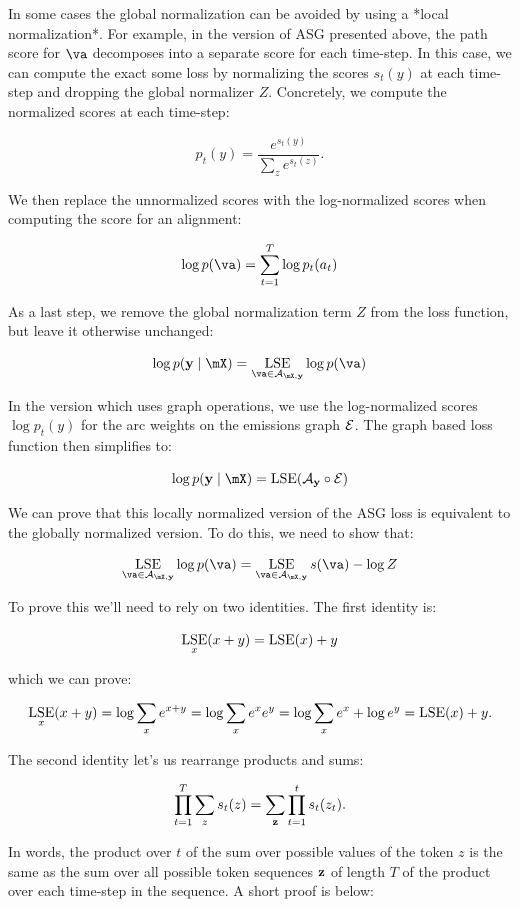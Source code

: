 In some cases the global normalization can be avoided by using a *local
normalization*. For example, in the version of ASG presented above, the path
score for $\va$ decomposes into a separate score for each time-step. In this
case, we can compute the exact some loss by normalizing the scores $s_t(y)$ at
each time-step and dropping the global normalizer $Z$. Concretely, we compute
the normalized scores at each time-step:

$$
p_t(y) = \frac{e^{s_t(y)}}{\sum_z e^{s_t(z)}}.
$$

We then replace the unnormalized scores with the log-normalized scores when
computing the score for an alignment:

$$
\log p(\va) = \sum_{t=1}^T \log p_t(a_t)
$$

As a last step, we remove the global normalization term $Z$ from the loss
function, but leave it otherwise unchanged:

$$
\log p(\vy \mid \mX) = \LSE_{\va \in \gA_{\mX, \vy}} \log p(\va)
$$

In the version which uses graph operations, we use the log-normalized scores
$\log p_t(y)$ for the arc weights on the emissions graph $\mathcal{E}$. The graph based
loss function then simplifies to:

$$
\log p(\vy \mid \mX) = \LSE(\gA_\vy \circ \gE)
$$

We can prove that this locally normalized version of the ASG loss is equivalent
to the globally normalized version. To do this, we need to show that:

$$
\LSE_{\va \in \gA_{\mX, \vy}} \log p(\va) = \LSE_{\va \in \gA_{\mX, \vy}} s(\va) - \log Z
$$

To prove this we'll need to rely on two identities. The first identity is:

$$
\operatorname*{\textrm{LSE}}_x( x + y) = \operatorname*{\textrm{LSE}}(x) + y
$$

which we can prove:

$$
\operatorname*{\textrm{LSE}}_x (x + y) = \log \sum_x e^{x+y} = \log \sum_x e^x e^y = \log \sum_x e^x + \log e^y = \operatorname*{\textrm{LSE}}(x) + y.
$$

The second identity let's us rearrange products and sums:

$$
\prod_{t=1}^T \sum_{z} s_t(z) = \sum_{\bf z} \prod_{t=1}^t s_t(z_t).
$$

In words, the product over $t$ of the sum over possible values of the token $z$
is the same as the sum over all possible token sequences ${\bf z}$ of length $T$ of
the product over each time-step in the sequence. A short proof is below:

